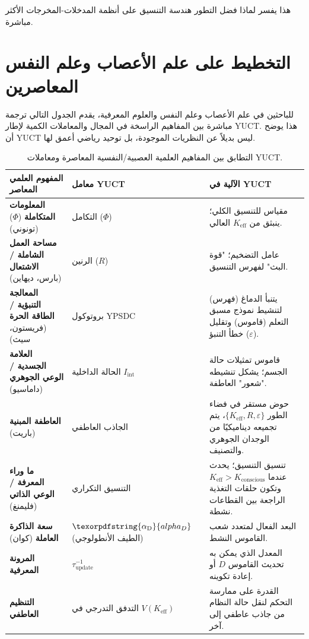 \documentclass[12pt,a4paper]{article}
\DeclareRobustCommand{\alD}{\texorpdfstring{\ensuremath{\alpha_{\mathrm{D}}}}{alpha_D}}
\begin{document}
	هذا يفسر لماذا فضل التطور هندسة التنسيق على أنظمة المدخلات-المخرجات الأكثر مباشرة.
	
	\section{التخطيط على علم الأعصاب وعلم النفس المعاصرين}
	
	للباحثين في علم الأعصاب وعلم النفس والعلوم المعرفية، يقدم الجدول التالي ترجمة مباشرة بين المفاهيم الراسخة في المجال والمعاملات الكمية لإطار YUCT. هذا يوضح أن YUCT ليس بديلاً عن النظريات الموجودة، بل توحيد رياضي أعمق لها.
	
	\begin{table}[H]
		\centering
		\caption{التطابق بين المفاهيم العلمية العصبية/النفسية المعاصرة ومعاملات YUCT.}
		\label{tab:mapping}
		\begin{tabular}{p{4.5cm} p{4cm} p{5cm}}
			\toprule
			\textbf{المفهوم العلمي المعاصر} & \textbf{معامل YUCT} & \textbf{الآلية في YUCT} \\
			\midrule
			\textbf{المعلومات المتكاملة} (\(\Phi\)) (تونوني) & التكامل (\(\Phi\)) & مقياس للتنسيق الكلي؛ ينبثق من \(K_{\mathrm{eff}}\) العالي. \\
			\textbf{مساحة العمل الشاملة / الاشتعال} (بارس، ديهاين) & الرنين (\(R\)) & عامل التضخيم؛ "قوة البث" لفهرس التنسيق. \\
			\textbf{المعالجة التنبؤية / الطاقة الحرة} (فريستون، سيث) & بروتوكول YPSDC & يتنبأ الدماغ (فهرس) لتنشيط نموذج مسبق التعلم (قاموس) وتقليل خطأ التنبؤ (\(\varepsilon\)). \\
			\textbf{العلامة الجسدية / الوعي الجوهري} (داماسيو) & الحالة الداخلية \(I_{\mathrm{int}}\) & قاموس تمثيلات حالة الجسم؛ يشكل تنشيطه "شعور" العاطفة. \\
			\textbf{العاطفة المبنية} (باريت) & الجاذب العاطفي & حوض مستقر في فضاء الطور \(\{K_{\mathrm{eff}}, R, \varepsilon\}\)، يتم تجميعه ديناميكيًا من الوجدان الجوهري والتصنيف. \\
			\textbf{ما وراء المعرفة / الوعي الذاتي} (فليمنغ) & التنسيق التكراري & تنسيق التنسيق؛ يحدث عندما \(K_{\mathrm{eff}} > K_{\mathrm{conscious}}\) وتكون حلقات التغذية الراجعة بين القطاعات نشطة. \\
			\textbf{سعة الذاكرة العاملة} (كوان) & \(\alD\) (الطيف الأنطولوجي) & البعد الفعال لمتعدد شعب القاموس النشط. \\
			\textbf{المرونة المعرفية} & \(\tau_{\mathrm{update}}^{-1}\) & المعدل الذي يمكن به تحديث القاموس \(D\) أو إعادة تكوينه. \\
			\textbf{التنظيم العاطفي} & التدفق التدرجي في \(V(K_{\mathrm{eff}})\) & القدرة على ممارسة التحكم لنقل حالة النظام من جاذب عاطفي إلى آخر. \\
			\bottomrule
		\end{tabular}
	\end{table}
	
\end{document}
